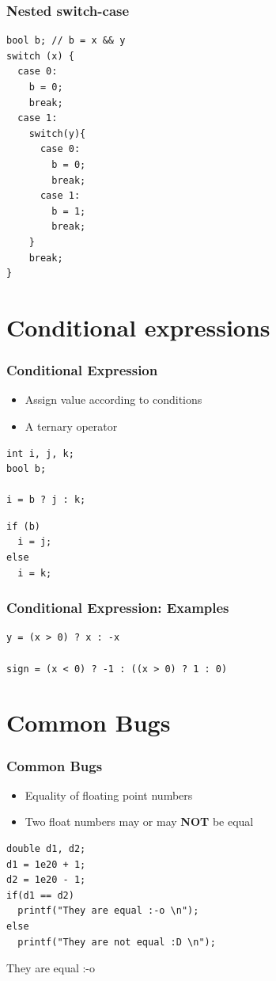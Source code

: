 \documentclass{../c-lecture}
\begin{document}
\begin{frame}[fragile]
  \frametitle{Nested switch-case}
  \scriptsize
  \begin{verbatim}
bool b; // b = x && y
switch (x) {
  case 0:
    b = 0;
    break;
  case 1:
    switch(y){
      case 0:
        b = 0;
        break;
      case 1:
        b = 1;
        break;
    }
    break;
}
  \end{verbatim}
\end{frame}

\section{Conditional expressions}

\begin{frame}[fragile]
  \frametitle{Conditional Expression}
  \begin{itemize}
    \item Assign value according to conditions
    \item A ternary operator
  \end{itemize}
  \begin{verbatim}
int i, j, k;
bool b;

i = b ? j : k;
  \end{verbatim}
  \begin{verbatim}
if (b)
  i = j;
else
  i = k;
  \end{verbatim}
\end{frame}

\begin{frame}[fragile]
  \frametitle{Conditional Expression: Examples}
  \begin{verbatim}
y = (x > 0) ? x : -x

sign = (x < 0) ? -1 : ((x > 0) ? 1 : 0)
  \end{verbatim}
\end{frame}

\section{Common Bugs}

\begin{frame}[fragile]
  \frametitle{Common Bugs}
  \begin{itemize}
    \item Equality of floating point numbers
    \item
      Two float numbers may or may \textbf{\color{RubineRed} NOT} be equal
  \end{itemize}
  \begin{verbatim}
double d1, d2;
d1 = 1e20 + 1;
d2 = 1e20 - 1;
if(d1 == d2)
  printf("They are equal :-o \n");
else
  printf("They are not equal :D \n");
  \end{verbatim}
  \begin{block}{}
  They are equal :-o
  \end{block}
\end{frame}
\end{document}
